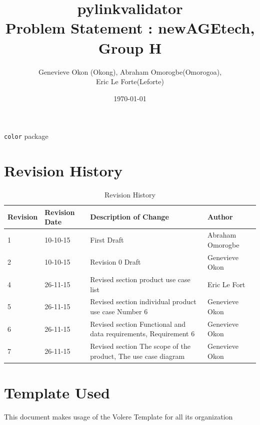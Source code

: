 \documentclass[titlepage]{article}
\begin{document}
\title{pylinkvalidator \\
 Problem Statement : newAGEtech, Group H }
\author{Genevieve Okon (Okong), Abraham Omorogbe(Omorogoa),\\
 Eric Le Forte(Leforte)}
\date{\today}
\maketitle

\texttt{color} package%
\tableofcontents
\listoffigures
\listoftables


\pagebreak


\section{Revision History}
\begin{table}[h!]
	\begin{tabular}{| p{5cm} | p{5cm} | p{5cm} |p{5cm} |}    \hline
Revision  &Revision Date &Description of Change &Author\\ \hline
1& 10-10-15&First Draft&Abraham Omorogbe\\ \hline
2& 10-10-15& Revision 0 Draft&Genevieve Okon\\ \hline
4& 26-11-15& Revised section product use case list &Eric Le Fort\\ \hline
5& 26-11-15& Revised section  individual product use case Number 6&Genevieve Okon\\ \hline
6& 26-11-15& Revised section Functional and data requirements, Requirement 6&Genevieve Okon\\ \hline
7& 26-11-15& Revised section The scope of the  product, The use case diagram &Genevieve Okon\\ \hline

       \end{tabular}
       
       \caption{Revision History}
       \label{table:Revision History}
\end{table}


\section *{Template Used}
This document makes usage of the Volere Template for all its organization
\end{document}
